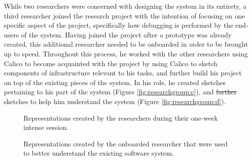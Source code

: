\documentclass[12pt,fleqn]{ucithesis}
\providecommand{\DIFaddtex}[1]{{\protect\color{blue}\uwave{#1}}} %
\providecommand{\DIFdeltex}[1]{{\protect\color{red}\sout{#1}}}                      %
\providecommand{\DIFaddbegin}{} %
\providecommand{\DIFaddend}{} %
\providecommand{\DIFdelbegin}{} %
\providecommand{\DIFdelend}{} %
\providecommand{\DIFadd}[1]{\texorpdfstring{\DIFaddtex{#1}}{#1}} %
\providecommand{\DIFdel}[1]{\texorpdfstring{\DIFdeltex{#1}}{}} %
\begin{document}
While two researchers were concerned with designing the system in its entirety, a third researcher joined the research project with the intention of focusing on one specific aspect of the project, specifically how debugging is performed by the end-users of the system. Having joined the project after a prototype was already created, this additional researcher needed to be onboarded in order to be brought up to speed. Throughout this process, he worked with the other researchers using Calico to become acquainted with the project by using Calico to sketch components of \DIFaddbegin \DIFadd{the }\DIFaddend infrastructure relevant to his tasks, and further build his project on top of the existing pieces of the system. In his role, he created sketches pertaining to his part of the system (Figure \ref{fig:researchgroup:c}), and \DIFdelbegin \DIFdel{further }\DIFdelend \DIFaddbegin \DIFadd{additional }\DIFaddend sketches to help him understand the system (Figure \ref{fig:researchgroup:d}).


\begin{figure}%
  \centering
   \caption {Representations created by the researchers during their one-week intense session.}
   \label{fig:researchgroup:1}   
\end{figure}%

\begin{figure}%
  \centering
   \caption {Representations created by the onboarded researcher that were used to better understand the existing software system.}
   \label{fig:researchgroup:2}   
\end{figure}%
\end{document}
